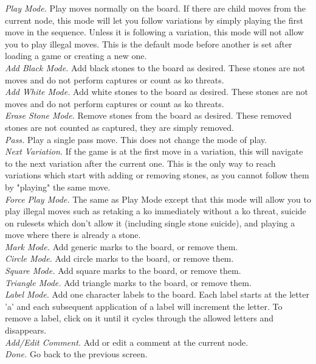 \begin {description}
    \emph {Play Mode. } Play moves normally on the board.  If there are
    child moves from the current node, this mode will let you follow variations
    by simply playing the first move in the sequence.  Unless it is following a
    variation, this mode will not allow you to play illegal moves.  This is the
    default mode before another is set after loading a game or creating a new
    one. \\
    \emph {Add Black Mode. } Add black stones to the board as desired. These
    stones are not moves and do not perform captures or count as ko threats. \\
    \emph {Add White Mode. } Add white stones to the board as desired. These
    stones are not moves and do not perform captures or count as ko threats. \\
    \emph {Erase Stone Mode. } Remove stones from the board as desired.  These
    removed stones are not counted as captured, they are simply removed. \\
    \emph {Pass. } Play a single pass move.  This does not change the mode of
    play. \\
    \emph {Next Variation. } If the game is at the first move in a variation,
    this will navigate to the next variation after the current one.  This is
    the only way to reach variations which start with adding or removing
    stones, as you cannot follow them by "playing" the same move. \\
    \emph {Force Play Mode. } The same as Play Mode except that this mode will
    allow you to play illegal moves such as retaking a ko immediately without a
    ko threat, suicide on rulesets which don't allow it (including single stone
    suicide), and playing a move where there is already a stone. \\
    \emph {Mark Mode. } Add generic marks to the board, or remove them. \\
    \emph {Circle Mode. } Add circle marks to the board, or remove them. \\
    \emph {Square Mode. } Add square marks to the board, or remove them. \\
    \emph {Triangle Mode. } Add triangle marks to the board, or remove them. \\
    \emph {Label Mode. } Add one character labels to the board.  Each label
    starts at the letter 'a' and each subsequent application of a label will
    increment the letter.  To remove a label, click on it until it cycles
    through the allowed letters and disappears. \\
    \emph {Add/Edit Comment. } Add or edit a comment at the current node. \\
    \emph {Done. } Go back to the previous screen. \\
\end{description}

